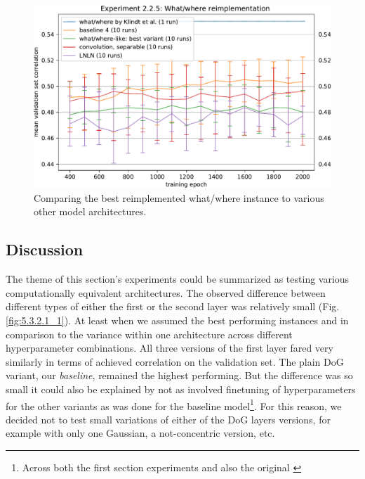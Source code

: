 \begin{figure}[H]
    \centering
    \includegraphics[width=1\textwidth]{../figures/05_2_2_5}
    \caption[Experiment 2.2.5]{Comparing the best reimplemented what/where instance to various other model architectures.}
    \label{fig:5.2.2.5}
\end{figure}

\subsection{Discussion}

The theme of this section’s experiments could be summarized as testing various computationally equivalent architectures. The observed difference between different types of either the first or the second layer was relatively small (Fig. \ref{fig:5.3.2.1_1}). At least when we assumed the best performing instances and in comparison to the variance within one architecture across different hyperparameter combinations. All three versions of the first layer fared very similarly in terms of achieved correlation on the validation set. The plain DoG variant, our \textit{baseline}, remained the highest performing. But the difference was so small it could also be explained by not as involved finetuning of hyperparameters for the other variants as was done for the baseline model\footnote{Across both the first section experiments and also the original \cite{antolik}}. For this reason, we decided not to test small variations of either of the DoG layers versions, for example with only one Gaussian, a not-concentric version, etc. 

